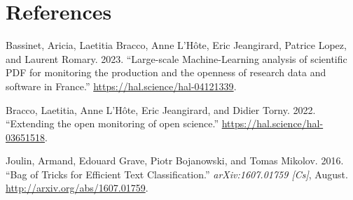 \documentclass[
]{article}
\newlength{\cslhangindent}
\newenvironment{cslreferences}%
  {\setlength{\parindent}{0pt}%
  \everypar{\setlength{\hangindent}{\cslhangindent}}\ignorespaces}%
  {\par}
\begin{document}
\hypertarget{references}{%
\section*{References}\label{references}}

\hypertarget{refs}{}
\begin{cslreferences}
\leavevmode\hypertarget{ref-bassinet:hal-04121339}{}%
Bassinet, Aricia, Laetitia Bracco, Anne L'Hôte, Eric Jeangirard, Patrice
Lopez, and Laurent Romary. 2023. ``Large-scale Machine-Learning analysis
of scientific PDF for monitoring the production and the openness of
research data and software in France.''
\url{https://hal.science/hal-04121339}.

\leavevmode\hypertarget{ref-bracco:hal-03651518}{}%
Bracco, Laetitia, Anne L'Hôte, Eric Jeangirard, and Didier Torny. 2022.
``Extending the open monitoring of open science.''
\url{https://hal.science/hal-03651518}.

\leavevmode\hypertarget{ref-joulin_bag_2016}{}%
Joulin, Armand, Edouard Grave, Piotr Bojanowski, and Tomas Mikolov.
2016. ``Bag of Tricks for Efficient Text Classification.''
\emph{arXiv:1607.01759 {[}Cs{]}}, August.
\url{http://arxiv.org/abs/1607.01759}.
\end{cslreferences}
\end{document}
